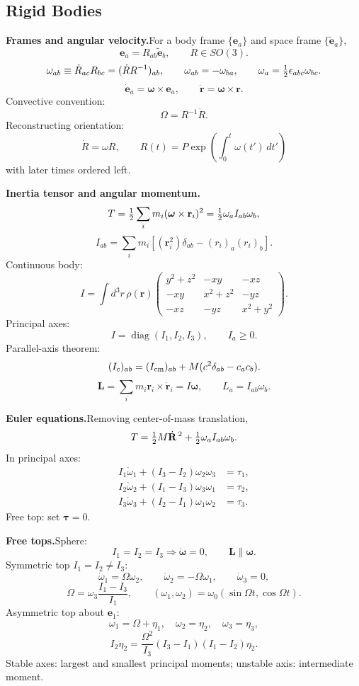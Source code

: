 \subsection{Rigid Bodies}

\noindent\textbf{Frames and angular velocity.}\quad For a body frame
$\{\mathbf e_a\}$ and space frame $\{\tilde{\mathbf e}_a\}$,
\[
\mathbf e_a=R_{ab}\tilde{\mathbf e}_b,\qquad R\in SO(3).
\]
\[
\omega_{ab}\equiv\dot R_{ac}R_{bc}=(\dot R R^{-1})_{ab},\qquad
\omega_{ab}=-\omega_{ba},\qquad
\omega_a=\tfrac{1}{2}\epsilon_{abc}\omega_{bc}.
\]
\[
\dot{\mathbf e}_a=\bm\omega\times\mathbf e_a,\qquad
\boxed{\dot{\mathbf r}=\bm\omega\times\mathbf r}.
\]
Convective convention:
\[
\Omega=R^{-1}\dot R.
\]
Reconstructing orientation:
\[
\dot R=\omega R,\qquad
\boxed{R(t)=P\exp\left(\int_0^t\omega(t')\,dt'\right)}
\]
with later times ordered left.

\noindent\textbf{Inertia tensor and angular momentum.}\quad
\[
T=\tfrac{1}{2}\sum_i m_i(\bm\omega\times\mathbf r_i)^2
=\tfrac{1}{2}\omega_aI_{ab}\omega_b,
\]
\[
\boxed{I_{ab}=\sum_i m_i[(\mathbf r_i^2)\delta_{ab}-(r_i)_a(r_i)_b]}.
\]
Continuous body:
\[
I=\int d^3r\,\rho(\mathbf r)
\begin{pmatrix}
y^2+z^2&-xy&-xz\\
-xy&x^2+z^2&-yz\\
-xz&-yz&x^2+y^2
\end{pmatrix}.
\]
Principal axes:
\[
I=\operatorname{diag}(I_1,I_2,I_3),\qquad I_a\ge0.
\]
Parallel-axis theorem:
\[
(I_c)_{ab}=(I_{\rm cm})_{ab}+M(c^2\delta_{ab}-c_ac_b).
\]
\[
\boxed{\mathbf L=\sum_i m_i\mathbf r_i\times\dot{\mathbf r}_i=I\bm\omega},
\qquad
L_a=I_{ab}\omega_b.
\]

\noindent\textbf{Euler equations.}\quad Removing center-of-mass translation,
\[
T=\tfrac{1}{2} M\dot{\mathbf R}^{\,2}+\tfrac{1}{2}\omega_aI_{ab}\omega_b.
\]
In principal axes:
\[
\boxed{
\begin{aligned}
I_1\dot\omega_1+(I_3-I_2)\omega_2\omega_3&=\tau_1,\\
I_2\dot\omega_2+(I_1-I_3)\omega_3\omega_1&=\tau_2,\\
I_3\dot\omega_3+(I_2-I_1)\omega_1\omega_2&=\tau_3.
\end{aligned}}
\]
Free top: set $\bm\tau=0$.

\noindent\textbf{Free tops.}\quad Sphere:
\[
I_1=I_2=I_3\Rightarrow \dot{\bm\omega}=0,\qquad
\mathbf L\parallel\bm\omega.
\]
Symmetric top $I_1=I_2\ne I_3$:
\[
\dot\omega_1=\Omega\omega_2,\qquad
\dot\omega_2=-\Omega\omega_1,\qquad
\dot\omega_3=0,
\]
\[
\Omega=\omega_3\frac{I_1-I_3}{I_1},\qquad
(\omega_1,\omega_2)=\omega_0(\sin\Omega t,\cos\Omega t).
\]
Asymmetric top about $\mathbf e_1$:
\[
\omega_1=\Omega+\eta_1,\quad \omega_2=\eta_2,\quad\omega_3=\eta_3,
\]
\[
I_2\ddot\eta_2
=\frac{\Omega^2}{I_3}(I_3-I_1)(I_1-I_2)\eta_2.
\]
Stable axes: largest and smallest principal moments; unstable axis: intermediate
moment.

